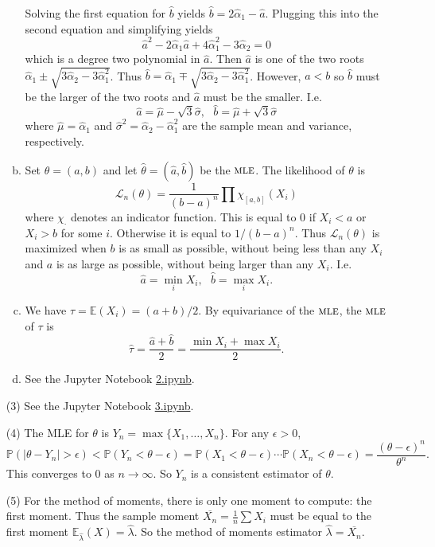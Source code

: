 \documentclass[10pt]{article}
\renewcommand{\P}{\mathbb{P}}
\newcommand{\E}{\mathbb{E}}
\newcommand{\MLE}{\textsc{mle}}
\begin{document}
\begin{enumerate}
\begin{enumerate}[(a)]
Solving the first equation for $\hat b$ yields $\hat b = 2\hat \alpha_1 - \hat a$.
Plugging this into the second equation and simplifying yields
\[
\hat a^2 - 2\hat \alpha_1 \hat a + 4\hat \alpha_1^2 - 3\hat \alpha_2 = 0
\]
which is a degree two polynomial in $\hat a$. Then $\hat a$ is one of the two roots
$\hat \alpha_1 \pm \sqrt{3\hat \alpha_2 - 3 \hat \alpha_1^2}$. Thus
$\hat b = \hat \alpha_1 \mp \sqrt{3\hat \alpha_2 - 3 \hat \alpha_1^2}$. However,
$a<b$ so $\hat b$ must be the larger of the two roots and $\hat a$ must be
the smaller. I.e.
\[
\hat a = \hat \mu - \sqrt{3}\hat \sigma, \ \ \
\hat b = \hat \mu + \sqrt{3}\hat \sigma
\]
where $\hat \mu=\hat \alpha_1$ and $\hat \sigma^2 = \hat \alpha_2 - \hat \alpha_1^2$
are the sample mean and variance, respectively.

\item Set $\theta=(a,b)$ and let $\hat \theta=(\hat a,\hat b)$ be the $\MLE$.
The likelihood of $\theta$ is
\[
\mathcal{L}_n(\theta) = \frac{1}{(b-a)^n}\prod \chi_{[a,b]}(X_i)
\]
where $\chi_\cdot$ denotes an indicator function. This is equal to $0$
if $X_i<a$ or $X_i>b$ for some $i$. Otherwise it is equal to $1/(b-a)^n$.
Thus $\mathcal L_n(\theta)$ is maximized when $b$ is as small as possible, without
being less than any $X_i$ and $a$ is as large as possible, without being larger
than any $X_i$. I.e.
\[
\hat a = \min_i X_i, \ \ \ \hat b = \max_i X_i.
\]
\item We have $\tau = \E(X_i)=(a+b)/2$. By equivariance of the $\MLE$,
the $\MLE$ of $\tau$ is
\[
\hat \tau = \frac{\hat a + \hat b}{2} = \frac{\min X_i + \max X_i}{2}.
\]

\item
See the Jupyter Notebook
\href{https://github.com/ajrasmus/some_of_statistics/blob/main/chapter_9/2.ipynb}{2.ipynb}.
\end{enumerate}

\item[(3)]
See the Jupyter Notebook
\href{https://github.com/ajrasmus/some_of_statistics/blob/main/chapter_9/3.ipynb}{3.ipynb}.

\item[(4)]
The MLE for $\theta$ is $Y_n=\max\{X_1,\ldots,X_n\}$. For any $\epsilon>0$,
\[
    \P(|\theta-Y_n|>\epsilon)<\P(Y_n < \theta-\epsilon)=\P(X_1<\theta-\epsilon)
    \cdots \P(X_n<\theta-\epsilon)=\frac{(\theta-\epsilon)^n}{\theta^n}.
\]
This converges to 0 as $n\to \infty$. So $Y_n$ is a consistent estimator of
$\theta$.

\item[(5)]
For the method of moments, there is only one moment to compute: the first moment.
Thus the sample moment $\overline{X_n}=\frac{1}{n}\sum X_i$ must be equal to
the first moment $\E_{\hat\lambda}(X)=\hat\lambda$. So the method of moments
estimator $\hat\lambda = \overline{X_n}$.


\end{enumerate}
\end{document}
